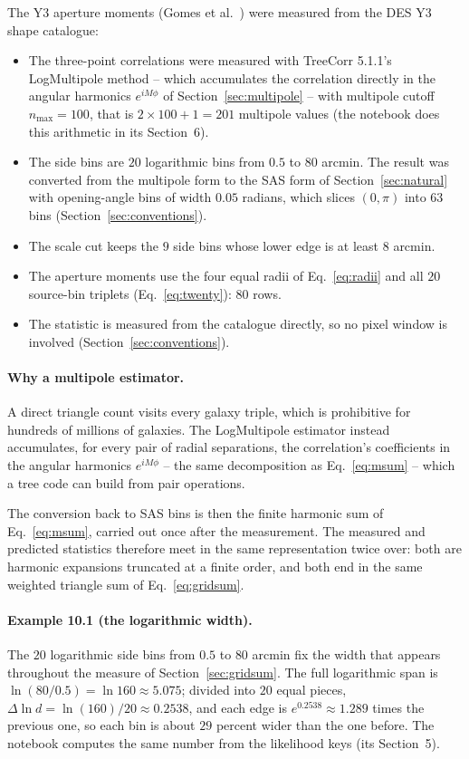 \documentclass[11pt]{article}
\numberwithin{equation}{section}
\begin{document}
The Y3 aperture moments (Gomes et al.~\cite{GomesMethods,
GomesData}) were measured from the DES Y3 shape catalogue:
\begin{itemize}
  \item The three-point correlations were measured with TreeCorr
    5.1.1's LogMultipole method -- which accumulates the correlation
    directly in the angular harmonics $e^{iM\phi}$ of
    Section~\ref{sec:multipole} -- with multipole cutoff
    $n_{\max} = 100$, that is $2 \times 100 + 1 = 201$ multipole
    values (the notebook does this arithmetic in its Section~6).
  \item The side bins are $20$ logarithmic bins from $0.5$ to $80$
    arcmin.  The result was converted from the multipole form to the
    SAS form of Section~\ref{sec:natural} with opening-angle bins of
    width $0.05$ radians, which slices $(0, \pi)$ into $63$ bins
    (Section~\ref{sec:conventions}).
  \item The scale cut keeps the $9$ side bins whose lower edge is at
    least $8$ arcmin.
  \item The aperture moments use the four equal radii of
    Eq.~\eqref{eq:radii} and all $20$ source-bin triplets
    (Eq.~\eqref{eq:twenty}): $80$ rows.
  \item The statistic is measured from the catalogue directly, so no
    pixel window is involved (Section~\ref{sec:conventions}).
\end{itemize}

\paragraph{Why a multipole estimator.}
A direct triangle count visits every galaxy triple, which is
prohibitive for hundreds of millions of galaxies.  The LogMultipole
estimator instead accumulates, for every pair of radial separations,
the correlation's coefficients in the angular harmonics
$e^{iM\phi}$ -- the same decomposition as
Eq.~\eqref{eq:msum} -- which a tree code can build from pair
operations.

The conversion back to SAS bins is then the finite harmonic sum of
Eq.~\eqref{eq:msum}, carried out once after the measurement.  The
measured and predicted statistics therefore meet in the same
representation twice over: both are harmonic expansions truncated at
a finite order, and both end in the same weighted triangle sum of
Eq.~\eqref{eq:gridsum}.

\paragraph{Example 10.1 (the logarithmic width).}
The $20$ logarithmic side bins from $0.5$ to $80$ arcmin fix the
width that appears throughout the measure of
Section~\ref{sec:gridsum}.  The full logarithmic span is
$\ln(80/0.5) = \ln 160 \approx 5.075$; divided into $20$ equal
pieces, $\Delta\ln d = \ln(160)/20 \approx 0.2538$, and each edge is
$e^{0.2538} \approx 1.289$ times the previous one, so each bin is
about $29$ percent wider than the one before.  The notebook
computes the same number from the likelihood keys (its Section~5).
\end{document}
